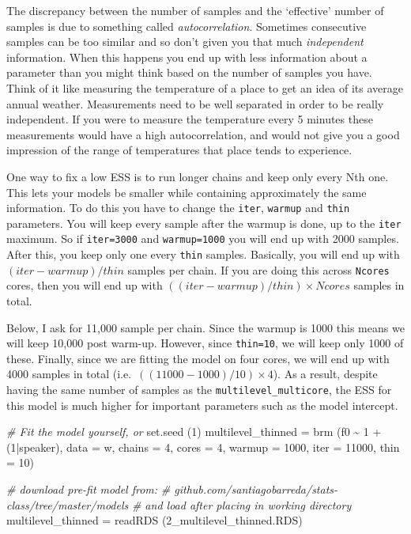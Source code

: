 \documentclass[
]{book}
\newenvironment{Shaded}{\begin{snugshade}}{\end{snugshade}}
\newcommand{\AttributeTok}[1]{\textcolor[rgb]{0.77,0.63,0.00}{#1}}
\newcommand{\CommentTok}[1]{\textcolor[rgb]{0.56,0.35,0.01}{\textit{#1}}}
\newcommand{\DecValTok}[1]{\textcolor[rgb]{0.00,0.00,0.81}{#1}}
\newcommand{\FunctionTok}[1]{\textcolor[rgb]{0.00,0.00,0.00}{#1}}
\newcommand{\NormalTok}[1]{#1}
\newcommand{\OtherTok}[1]{\textcolor[rgb]{0.56,0.35,0.01}{#1}}
\newcommand{\SpecialCharTok}[1]{\textcolor[rgb]{0.00,0.00,0.00}{#1}}
\newcommand{\StringTok}[1]{\textcolor[rgb]{0.31,0.60,0.02}{#1}}
\begin{document}
The discrepancy between the number of samples and the `effective' number of samples is due to something called \emph{autocorrelation}. Sometimes consecutive samples can be too similar and so don't given you that much \emph{independent} information. When this happens you end up with less information about a parameter than you might think based on the number of samples you have. Think of it like measuring the temperature of a place to get an idea of its average annual weather. Measurements need to be well separated in order to be really independent. If you were to measure the temperature every 5 minutes these measurements would have a high autocorrelation, and would not give you a good impression of the range of temperatures that place tends to experience.

One way to fix a low ESS is to run longer chains and keep only every Nth one. This lets your models be smaller while containing approximately the same information. To do this you have to change the \texttt{iter}, \texttt{warmup} and \texttt{thin} parameters. You will keep every sample after the warmup is done, up to the \texttt{iter} maximum. So if \texttt{iter=3000} and \texttt{warmup=1000} you will end up with 2000 samples. After this, you keep only one every \texttt{thin} samples. Basically, you will end up with \((iter-warmup) / thin\) samples per chain. If you are doing this across \texttt{Ncores} cores, then you will end up with \(((iter-warmup) / thin) \times Ncores\) samples in total.

Below, I ask for 11,000 sample per chain. Since the warmup is 1000 this means we will keep 10,000 post warm-up. However, since \texttt{thin=10}, we will keep only 1000 of these. Finally, since we are fitting the model on four cores, we will end up with 4000 samples in total (i.e.~\(((11000-1000) / 10) \times 4\)). As a result, despite having the same number of samples as the \texttt{multilevel\_multicore}, the ESS for this model is much higher for important parameters such as the model intercept.

\begin{Shaded}
\begin{Highlighting}[]
\CommentTok{\# Fit the model yourself, or}
\FunctionTok{set.seed}\NormalTok{ (}\DecValTok{1}\NormalTok{)}
\NormalTok{multilevel\_thinned }\OtherTok{=}  
  \FunctionTok{brm}\NormalTok{ (f0 }\SpecialCharTok{\textasciitilde{}} \DecValTok{1} \SpecialCharTok{+}\NormalTok{ (}\DecValTok{1}\SpecialCharTok{|}\NormalTok{speaker), }\AttributeTok{data =}\NormalTok{ w, }\AttributeTok{chains =} \DecValTok{4}\NormalTok{, }\AttributeTok{cores =} \DecValTok{4}\NormalTok{,}
       \AttributeTok{warmup =} \DecValTok{1000}\NormalTok{, }\AttributeTok{iter =} \DecValTok{11000}\NormalTok{, }\AttributeTok{thin =} \DecValTok{10}\NormalTok{)}

\CommentTok{\# download pre{-}fit model from: }
\CommentTok{\# github.com/santiagobarreda/stats{-}class/tree/master/models}
\CommentTok{\# and load after placing in working directory}
\NormalTok{multilevel\_thinned }\OtherTok{=} \FunctionTok{readRDS}\NormalTok{ (}\StringTok{\textquotesingle{}2\_multilevel\_thinned.RDS\textquotesingle{}}\NormalTok{)}
\end{Highlighting}
\end{Shaded}
\end{document}
